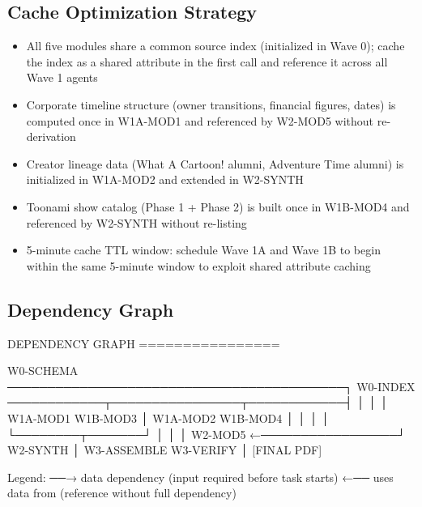 \documentclass[11pt,letterpaper]{article}
\begin{document}
\subsection{Cache Optimization Strategy}

\begin{itemize}
  \item All five modules share a common source index (initialized in Wave 0); cache the index as a shared attribute in the first call and reference it across all Wave 1 agents
  \item Corporate timeline structure (owner transitions, financial figures, dates) is computed once in W1A-MOD1 and referenced by W2-MOD5 without re-derivation
  \item Creator lineage data (What A Cartoon! alumni, Adventure Time alumni) is initialized in W1A-MOD2 and extended in W2-SYNTH
  \item Toonami show catalog (Phase 1 + Phase 2) is built once in W1B-MOD4 and referenced by W2-SYNTH without re-listing
  \item 5-minute cache TTL window: schedule Wave 1A and Wave 1B to begin within the same 5-minute window to exploit shared attribute caching
\end{itemize}

\subsection{Dependency Graph}

\begin{asciibox}
DEPENDENCY GRAPH
================

  W0-SCHEMA ──────────────────────────────────────────┐
  W0-INDEX  ────────────┬────────────────┬────────────┤
                        │                │            │
                   W1A-MOD1         W1B-MOD3          │
                   W1A-MOD2         W1B-MOD4          │
                        │                │            │
                        └────────┬───────┘            │
                                 │                    │
                           W2-MOD5 ←─────────────────┘
                           W2-SYNTH
                                 │
                         W3-ASSEMBLE
                         W3-VERIFY
                                 │
                           [FINAL PDF]

  Legend:
  ──→  data dependency (input required before task starts)
  ←──  uses data from (reference without full dependency)
\end{asciibox}
\end{document}
